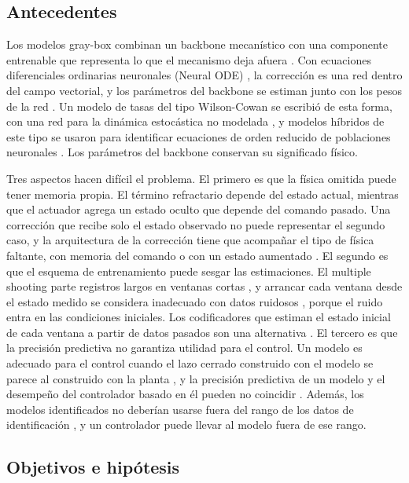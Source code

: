 \documentclass[11pt,a4paper]{article}
\begin{document}
\subsection{Antecedentes}

Los modelos gray-box combinan un backbone mecanístico con una componente entrenable que representa lo que el mecanismo deja afuera \cite{psichogios1992,rackauckas2020}. Con ecuaciones diferenciales ordinarias neuronales (Neural ODE) \cite{chen2018}, la corrección es una red dentro del campo vectorial, y los parámetros del backbone se estiman junto con los pesos de la red \cite{yin2021,giampiccolo2024}. Un modelo de tasas del tipo Wilson-Cowan se escribió de esta forma, con una red para la dinámica estocástica no modelada \cite{elgazzar2025}, y modelos híbridos de este tipo se usaron para identificar ecuaciones de orden reducido de poblaciones neuronales \cite{chesebro2025}. Los parámetros del backbone conservan su significado físico.

Tres aspectos hacen difícil el problema. El primero es que la física omitida puede tener memoria propia. El término refractario depende del estado actual, mientras que el actuador agrega un estado oculto que depende del comando pasado. Una corrección que recibe solo el estado observado no puede representar el segundo caso, y la arquitectura de la corrección tiene que acompañar el tipo de física faltante, con memoria del comando \cite{forgione2021} o con un estado aumentado \cite{dupont2019}. El segundo es que el esquema de entrenamiento puede sesgar las estimaciones. El multiple shooting parte registros largos en ventanas cortas \cite{ribeiro2020,turan2022}, y arrancar cada ventana desde el estado medido se considera inadecuado con datos ruidosos \cite{turan2022}, porque el ruido entra en las condiciones iniciales. Los codificadores que estiman el estado inicial de cada ventana a partir de datos pasados son una alternativa \cite{beintema2021}. El tercero es que la precisión predictiva no garantiza utilidad para el control. Un modelo es adecuado para el control cuando el lazo cerrado construido con el modelo se parece al construido con la planta \cite{gevers2005}, y la precisión predictiva de un modelo y el desempeño del controlador basado en él pueden no coincidir \cite{lambert2020,bolus2018}. Además, los modelos identificados no deberían usarse fuera del rango de los datos de identificación \cite{schoukens2019}, y un controlador puede llevar al modelo fuera de ese rango.

\subsection{Objetivos e hipótesis}
\end{document}
